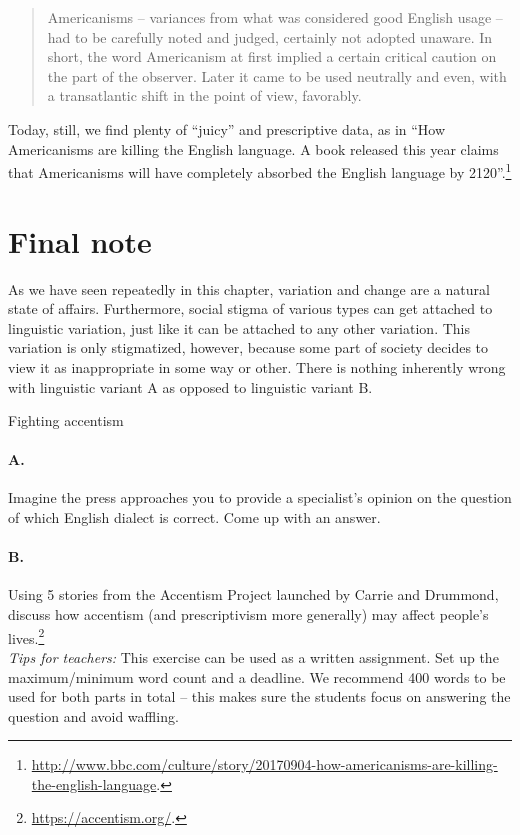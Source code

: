 \begin{quote}
    Americanisms -- variances from what was considered good English usage -- had to be carefully noted and judged, certainly not adopted unaware. In short, the word Americanism at first implied a certain critical caution on the part of the observer. Later it came to be used neutrally and even, with a transatlantic shift in the point of view, favorably.
\end{quote}

\noindent Today, still, we find plenty of ``juicy'' and prescriptive data, as in ``How Americanisms are killing the English language. A book released this year claims that Americanisms will have completely absorbed the English language by 2120''.\footnote{\url{http://www.bbc.com/culture/story/20170904-how-americanisms-are-killing-the-english-language}.}

\section{Final note}
As we have seen repeatedly in this chapter, variation and change are a natural state of affairs. Furthermore, social stigma of various types can get attached to linguistic variation, just like it can be attached to any other variation. This variation is only stigmatized, however, because some part of society decides to view it as inappropriate in some way or other. There is nothing inherently wrong with linguistic variant A as opposed to linguistic variant B.


\begin{exercises}{Fighting accentism}
\paragraph*{A.}
Imagine the press approaches you to provide a specialist's opinion on the question of which English dialect is correct. Come up with an answer.

\paragraph*{B.}
Using 5 stories from the Accentism Project launched by Carrie and Drummond, discuss how accentism (and prescriptivism more generally) may affect people's lives.\footnote{\url{https://accentism.org/}.}\\

\noindent \emph{Tips for teachers:} This exercise can be used as a written assignment. Set up the maximum/minimum word count and a deadline. We recommend 400 words to be used for both parts in total -- this makes sure the students focus on answering the question and avoid waffling.

\end{exercises}


